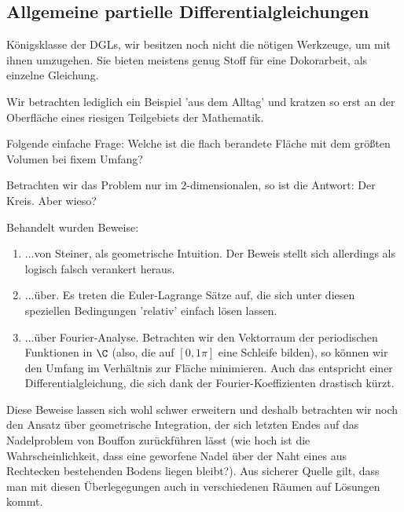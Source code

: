 \documentclass[main.tex]{subfiles}
\begin{document}
\subsection{Allgemeine partielle Differentialgleichungen}

Königsklasse der DGLs, wir besitzen noch nicht die nötigen Werkzeuge, um mit ihnen umzugehen. Sie bieten meistens genug Stoff für eine Dokorarbeit, als einzelne Gleichung.

Wir betrachten lediglich ein Beispiel 'aus dem Alltag' und kratzen so erst an der Oberfläche eines riesigen Teilgebiets der Mathematik.

\begin{Beispiel}
  Folgende einfache Frage: Welche ist die flach berandete Fläche mit dem größten Volumen bei fixem Umfang?

  Betrachten wir das Problem nur im 2-dimensionalen, so ist die Antwort: Der Kreis. Aber wieso?

  Behandelt wurden Beweise:
  \begin{enumerate}
    \item ...von Steiner, als geometrische Intuition. Der Beweis stellt sich allerdings als logisch falsch verankert heraus.
    \item ...über. Es treten die Euler-Lagrange Sätze auf, die sich unter diesen speziellen Bedingungen 'relativ' einfach lösen lassen.
    \item ...über Fourier-Analyse. Betrachten wir den Vektorraum der periodischen Funktionen in $\C$ (also, die auf $[0,1\pi]$ eine Schleife bilden), so können wir den Umfang im Verhältnis zur Fläche minimieren. Auch das entspricht einer Differentialgleichung, die sich dank der Fourier-Koeffizienten drastisch kürzt.
  \end{enumerate}

  Diese Beweise lassen sich wohl schwer erweitern und deshalb betrachten wir noch den Ansatz über geometrische Integration, der sich letzten Endes auf das Nadelproblem von Bouffon zurückführen lässt (wie hoch ist die Wahrscheinlichkeit, dass eine geworfene Nadel über der Naht eines aus Rechtecken bestehenden Bodens liegen bleibt?). Aus sicherer Quelle gilt, dass man mit diesen Überlegegungen auch in verschiedenen Räumen auf Lösungen kommt.
\end{Beispiel}
\end{document}
